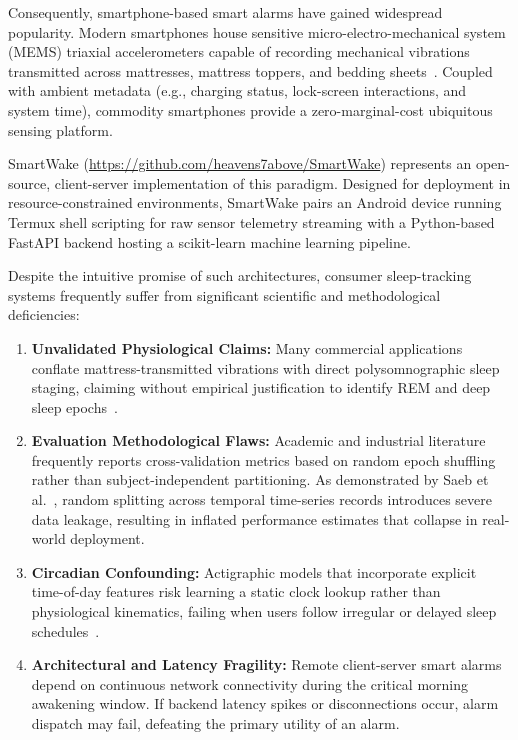 \documentclass[journal,11pt,onecolumn]{IEEEtran}
\begin{document}
Consequently, smartphone-based smart alarms have gained widespread popularity. Modern smartphones house sensitive micro-electro-mechanical system (MEMS) triaxial accelerometers capable of recording mechanical vibrations transmitted across mattresses, mattress toppers, and bedding sheets~\cite{min2014toss, hao2013isleep, gu2014sleephunter}. Coupled with ambient metadata (e.g., charging status, lock-screen interactions, and system time), commodity smartphones provide a zero-marginal-cost ubiquitous sensing platform. 

SmartWake (\url{https://github.com/heavens7above/SmartWake}) represents an open-source, client-server implementation of this paradigm. Designed for deployment in resource-constrained environments, SmartWake pairs an Android device running Termux shell scripting for raw sensor telemetry streaming with a Python-based FastAPI backend hosting a scikit-learn machine learning pipeline. 

Despite the intuitive promise of such architectures, consumer sleep-tracking systems frequently suffer from significant scientific and methodological deficiencies:
\begin{enumerate}[leftmargin=*]
    \item \textbf{Unvalidated Physiological Claims:} Many commercial applications conflate mattress-transmitted vibrations with direct polysomnographic sleep staging, claiming without empirical justification to identify REM and deep sleep epochs~\cite{meltzer2014use, stone2020evaluation}.
    \item \textbf{Evaluation Methodological Flaws:} Academic and industrial literature frequently reports cross-validation metrics based on random epoch shuffling rather than subject-independent partitioning. As demonstrated by Saeb et al.~\cite{saeb2017need}, random splitting across temporal time-series records introduces severe data leakage, resulting in inflated performance estimates that collapse in real-world deployment.
    \item \textbf{Circadian Confounding:} Actigraphic models that incorporate explicit time-of-day features risk learning a static clock lookup rather than physiological kinematics, failing when users follow irregular or delayed sleep schedules~\cite{roenneberg2003life, akerstedt2002prospective}.
    \item \textbf{Architectural and Latency Fragility:} Remote client-server smart alarms depend on continuous network connectivity during the critical morning awakening window. If backend latency spikes or disconnections occur, alarm dispatch may fail, defeating the primary utility of an alarm.
\end{enumerate}
\end{document}
